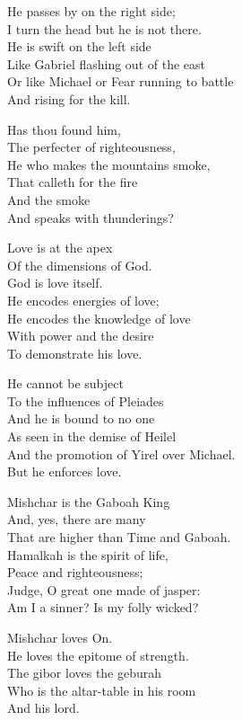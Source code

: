 \documentclass[
]{book}
\begin{document}
He passes by on the right side;\\
I turn the head but he is not there.\\
He is swift on the left side\\
Like Gabriel flashing out of the east\\
Or like Michael or Fear running to battle\\
And rising for the kill.

Has thou found him,\\
The perfecter of righteousness,\\
He who makes the mountains smoke,\\
That calleth for the fire\\
And the smoke\\
And speaks with thunderings?

Love is at the apex\\
Of the dimensions of God.\\
God is love itself.\\
He encodes energies of love;\\
He encodes the knowledge of love\\
With power and the desire\\
To demonstrate his love.

He cannot be subject\\
To the influences of Pleiades\\
And he is bound to no one\\
As seen in the demise of Heilel\\
And the promotion of Yirel over Michael.\\
But he enforces love.

Mishchar is the Gaboah King\\
And, yes, there are many\\
That are higher than Time and Gaboah.\\
Hamalkah is the spirit of life,\\
Peace and righteousness;\\
Judge, O great one made of jasper:\\
Am I a sinner? Is my folly wicked?

Mishchar loves On.\\
He loves the epitome of strength.\\
The gibor loves the geburah\\
Who is the altar-table in his room\\
And his lord.
\end{document}
